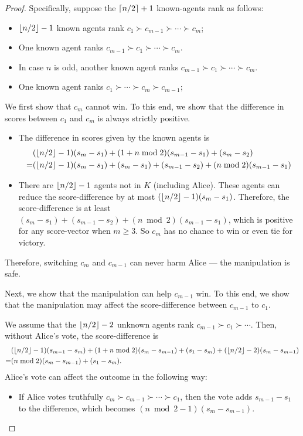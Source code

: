 \begin{proof}
\iffalse %
Specifically, suppose the $\left\lceil n/2 \right\rceil+1$ known-agents rank as follows:
\begin{itemize}
\item $\left\lfloor n/2 \right\rfloor-1$ known agents rank $c_1 \succ c_{m-1} \succ \cdots \succ c_m$;
\item One known agent ranks $c_{m-1} \succ c_1 \succ \cdots \succ c_m$. 
\item In case $n$ is odd, another known agent ranks $c_{m-1} \succ c_1 \succ \cdots \succ c_m$.
\item One known agent ranks $c_1 \succ  \cdots \succ  c_m \succ c_{m-1}$;
\end{itemize}
We first show that $c_m$ cannot win. To this end, we show that the difference in scores between $c_1$ and $c_m$ is always strictly positive.
\begin{itemize}
\item The difference in scores given by the known agents is 
\begin{align*}
&
(\left\lfloor n/2 \right\rfloor-1)(s_m-s_1) + (1+n\bmod 2)(s_{m-1}-s_1) + (s_m-s_2)
\\
=&
(\left\lfloor n/2 \right\rfloor-1)(s_m-s_1) + 
(s_m-s_1)
+ 
(s_{m-1}-s_2)
+
(n\bmod 2)(s_{m-1}-s_1)
\end{align*}
\item There are
$\left\lfloor n/2 \right\rfloor-1$ agents not in $K$ (including Alice).
These agents can reduce the score-difference by at most 
$(\left\lfloor n/2 \right\rfloor-1)(s_m-s_1)$.
Therefore, the score-difference is at least 
$(s_m-s_1)
+ 
(s_{m-1}-s_2)
+
(n\bmod 2)(s_{m-1}-s_1)$,
which is positive for any score-vector when $m\geq 3$. So $c_m$ has no chance to win or even tie for victory.
\end{itemize}
Therefore, switching $c_m$ and $c_{m-1}$ can never harm Alice --- the manipulation is safe.

Next, we show that the manipulation can help $c_{m-1}$ win. To this end, we show that the manipulation may affect the score-difference between $c_{m-1}$ to $c_1$.

We assume that the $\left\lfloor n/2 \right\rfloor-2$ unknown agents rank $c_{m-1}\succ c_1\succ \cdots $. Then, without Alice's vote, the score-difference is
\begin{align*}
&
(\left\lfloor n/2 \right\rfloor-1)(s_{m-1}-s_m) + (1+n\bmod 2)(s_m-s_{m-1}) + (s_1-s_m)
+
(\left\lfloor n/2 \right\rfloor-2)(s_m-s_{m-1})
\\
=&
(n\bmod 2)(s_m-s_{m-1}) 
+ (s_1-s_m).
\end{align*}
Alice's vote can affect the outcome in the following way:
\begin{itemize}
\item If Alice votes truthfully $c_m\succ c_{m-1}\succ \cdots \succ c_1$, then the vote adds $s_{m-1}-s_1$ to the difference, which becomes 
$(n\bmod 2-1)(s_m - s_{m-1})$.


\end{itemize}
\end{proof}
